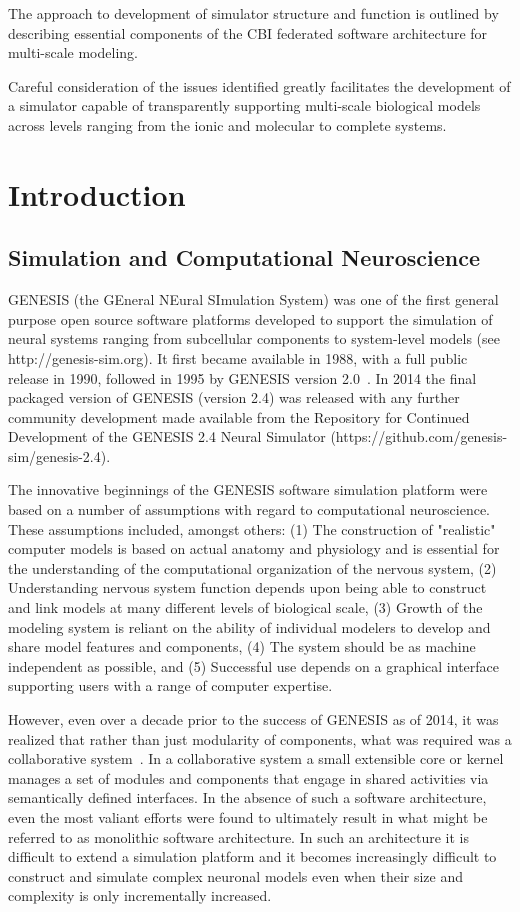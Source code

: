 \documentclass{article}
\begin{document}
The approach to development of simulator structure and function is outlined by describing essential components of the CBI federated software architecture for multi-scale modeling.

Careful consideration of the issues identified greatly facilitates the development of a simulator capable of transparently supporting multi-scale biological models across levels ranging from the ionic and molecular to complete systems.


\section{Introduction}

\subsection{Simulation and Computational Neuroscience}
GENESIS (the GEneral NEural SImulation System) was one of the first general purpose open source software platforms developed to support the simulation of neural systems ranging from subcellular components to system-level models (see http://genesis-sim.org). It first became available in 1988, with a full public release in 1990, followed in 1995 by GENESIS version 2.0~\cite{jung22}. In 2014 the final packaged version of GENESIS (version 2.4) was released with any further community development made available from the Repository for Continued Development of the GENESIS 2.4 Neural Simulator (https://github.com/genesis-sim/genesis-2.4).

The innovative beginnings of the GENESIS software simulation platform were based on a number of assumptions with regard to computational neuroscience. These assumptions included, amongst others: (1) The construction of "realistic" computer models is based on actual anatomy and physiology and is essential for the understanding of the computational organization of the nervous system, (2) Understanding nervous system function depends upon being able to construct and link models at many different levels of biological scale, (3) Growth of the modeling system is reliant on the ability of individual modelers to develop and share model features and components, (4) The system should be as machine independent as possible, and (5) Successful use depends on a graphical interface supporting users with a range of computer expertise.

However, even over a decade prior to the success of GENESIS as of 2014, it was realized that rather than just modularity of components, what was required was a collaborative system~\cite{cornelis03}. In a collaborative system a small extensible core or kernel manages a set of modules and components that engage in shared activities via semantically defined interfaces. In the absence of such a software architecture, even the most valiant efforts were found to ultimately result in what might be referred to as monolithic software architecture. In such an architecture it is difficult to extend a simulation platform and it becomes increasingly difficult to construct and simulate complex neuronal models even when their size and complexity is only incrementally increased.
\end{document}
